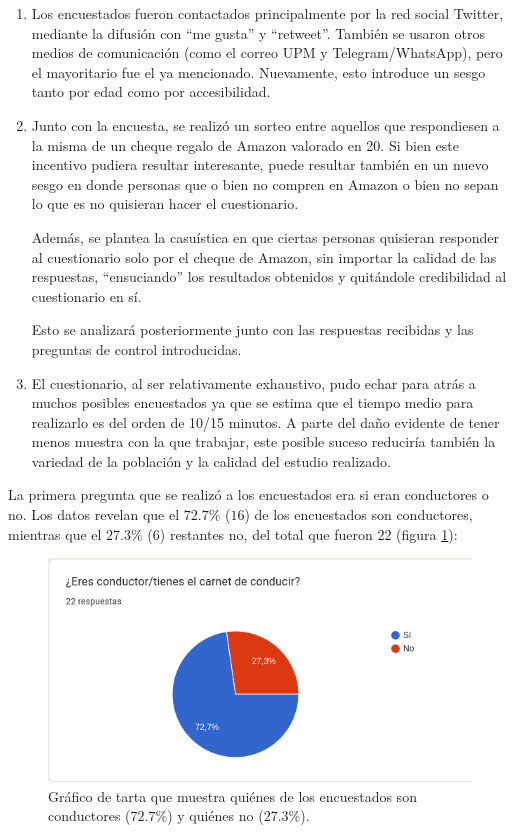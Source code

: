 \begin{enumerate}
  \item Los encuestados fueron contactados principalmente por la red social Twitter,
        mediante la difusión con ``me gusta'' y ``retweet''. También se usaron otros
        medios de comunicación (como el correo UPM y Telegram/WhatsApp), pero el
        mayoritario fue el ya mencionado. Nuevamente, esto introduce un sesgo tanto
        por edad como por accesibilidad.

  \item Junto con la encuesta, se realizó un sorteo entre aquellos que respondiesen
        a la misma de un cheque regalo de Amazon valorado en 20\EUR{}. Si bien este
        incentivo pudiera resultar interesante, puede resultar también en un nuevo
        sesgo en donde personas que o bien no compren en Amazon o bien no sepan
        lo que es no quisieran hacer el cuestionario.

        Además, se plantea la casuística en que ciertas personas quisieran responder
        al cuestionario solo por el cheque de Amazon, sin importar la calidad de
        las respuestas, ``ensuciando'' los resultados obtenidos y quitándole credibilidad
        al cuestionario en sí.

        Esto se analizará posteriormente junto con las respuestas recibidas y las
        preguntas de control introducidas.

  \item El cuestionario, al ser relativamente exhaustivo, pudo echar para atrás a muchos
        posibles encuestados ya que se estima que el tiempo medio para realizarlo es del
        orden de 10/15 minutos. A parte del daño evidente de tener menos muestra con la
        que trabajar, este posible suceso reduciría también la variedad de la población
        y la calidad del estudio realizado.
\end{enumerate}

La primera pregunta que se realizó a los encuestados era si eran conductores o no.
Los datos revelan que el $72.7\%$ ($16$) de los encuestados son conductores, mientras que el
$27.3\%$ ($6$) restantes no, del total que fueron $22$ (figura \ref{fig:drivers-nodrivers}):

\begin{figure}[H]
  \centering
  \includegraphics[width=\linewidth]{images/drivers-nodrivers.png}
  \caption{Gráfico de tarta que muestra quiénes de los encuestados son conductores ($72.7\%$) y quiénes no ($27.3\%$).}
  \label{fig:drivers-nodrivers}
\end{figure}

